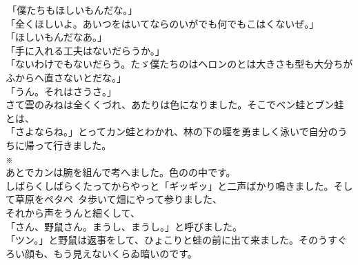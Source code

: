 \documentclass[
a4paper,
10pt,
book]
{tarticle}
\begin{document}
\newpage
\setcounter{page}{3}
\thispagestyle{fancy}

\noindent \,「僕たちもほしいもんだな。」\\
「全くほしいよ。あいつをはいてならのいがでも何でもこはくないぜ。」\\
「ほしいもんだなあ。」\\
「手に入れる工夫はないだらうか。」\\
「ないわけでもないだらう。たゞ僕たちのはヘロンのとは大きさも型も大分ちがふからへ直さないとだな。」\\
「うん。それはさうさ。」\\
\indent さて雲のみねは全くくづれ、あたりは色になりました。そこでベン蛙とブン蛙とは、\\
「さよならね。」とってカン蛙とわかれ、林の下の堰を勇ましく泳いで自分のうちに帰って行きました。\\
\indent \indent \indent \indent \indent \indent \indent \indent \indent \indent ※\\
\indent あとでカンは腕を組んで考へました。色のの中です。\\
しばらくしばらくたってからやっと「ギッギッ」と二声ばかり鳴きました。そして草原をペタペ~タ歩いて畑にやって参りました、\\
\indent それから声をうんと細くして、\\
「さん、野鼠さん。まうし、まうし。」と呼びました。\\
「ツン。」と野鼠は返事をして、ひょこりと蛙の前に出て来ました。そのうすぐろい顔も、もう見えないくらゐ暗いのです。
\end{document}
